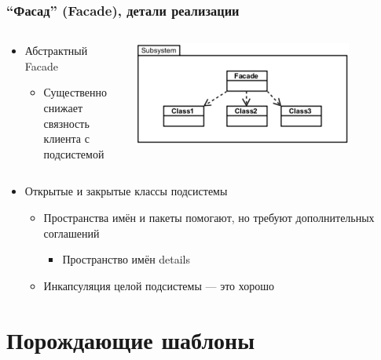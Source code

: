 \documentclass[xetex,mathserif,serif]{beamer}
\begin{document}
	\begin{frame}
		\frametitle{``Фасад'' (Facade), детали реализации}
		\begin{columns}
			\begin{column}{0.5\textwidth}
				\begin{itemize}
					\item Абстрактный Facade
					\begin{itemize}
						\item Существенно снижает связность клиента с подсистемой
					\end{itemize}
				\end{itemize}
			\end{column}
			\begin{column}{0.5\textwidth}
				\begin{center}
					\includegraphics[width=0.8\textwidth]{facade.png}
				\end{center}
			\end{column}
		\end{columns}
		\begin{itemize}
			\item Открытые и закрытые классы подсистемы
			\begin{itemize}
				\item Пространства имён и пакеты помогают, но требуют дополнительных соглашений
				\begin{itemize}
					\item Пространство имён details
				\end{itemize}
				\item Инкапсуляция целой подсистемы --- это хорошо
			\end{itemize}
		\end{itemize}
	\end{frame}

	\section{Порождающие шаблоны}
\end{document}
